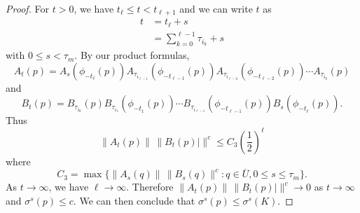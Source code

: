 \begin{proof}
	For \(t> 0\), we have \(t_\ell\leq t < t_{\ell+1}\) and we can write \(t\) as
	\begin{equation}
		\begin{aligned}
			t &= t_\ell + s \\
			&= \sum_{k=0}^{\ell - 1} \tau_{i_k} +s 
		\end{aligned}
	\end{equation}
	with \(0\leq s <\tau_m.\) By our product formulas,
	\begin{equation}
		A_t(p) = A_s( \phi_{-t_\ell}(p) ) A_{\tau_{i_{\ell-1}}}(\phi_{-t_{\ell-1}}(p)) A_{\tau_{i_{\ell-2}}}(\phi_{-t_{\ell-2}}(p)) \cdots A_{\tau_{i_0}}(p)
	\end{equation}
	and 
	\begin{equation}
		B_t(p) = B_{\tau_{i_0}}(p) B_{\tau_{i_1}}(\phi_{-t_1}(p)) \cdots B_{\tau_{i_{\ell-1}}}(\phi_{-t_{\ell-1}}(p)) B_s(\phi_{-t_\ell}(p)).
	\end{equation}
	Thus
	\begin{equation}
		\| A_t(p) \| \, \| B_t(p)| \|^c \leq C_3 \left( \frac 1 2 \right)^\ell
	\end{equation}
	where 
	\begin{equation}
		C_3 = \max\{ \| A_s(q) \| \, \| B_s(q) \|^c : q\in \overline U, 0 \leq s \leq \tau_m\}.
	\end{equation}
	As \(t\to\infty\), we have \(\ell \to \infty\). Therefore \( \| A_t(p) \| \, \| B_t(p)| \|^c\to 0\) as \(t\to\infty\) and \(\sigma^s(p) \leq c\). We can then conclude that \(\sigma^s(p) \leq \sigma^s(K).\)
\end{proof}